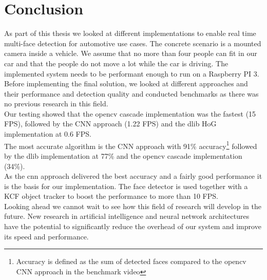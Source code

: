 \chapter{Conclusion}
As part of this thesis we looked at different implementations to enable real time multi-face detection for automotive use cases. The concrete scenario is a mounted camera inside a vehicle. We assume that no more than four people can fit in our car and that the people do not move a lot while the car is driving. The implemented system needs to be performant enough to run on a Raspberry PI 3.\\
Before implementing the final solution, we looked at different approaches and their performance and detection quality and conducted benchmarks as there was no previous research in this field.\\
Our testing showed that the \gls{opencv} cascade implementation was the fastest (15 FPS), followed by the CNN approach (1.22 FPS) and the \gls{dlib} HoG implementation at 0.6 FPS.\\
The most accurate algorithm is the CNN approach with 91\% accuracy\footnote{Accuracy is defined as the sum of detected faces compared to the \gls{opencv} CNN approach in the benchmark video} followed by the \gls{dlib} implementation at 77\% and the \gls{opencv} cascade implementation (34\%).\\
As the \gls{cnn} approach delivered the best accuracy and a fairly good performance it is the basis for our implementation. The face detector is used together with a KCF object tracker to boost the performance to more than 10 FPS.\\
Looking ahead we cannot wait to see how this field of research will develop in the future. New research in artificial intelligence and neural network architectures have the potential to significantly reduce the overhead of our system and improve its speed and performance. 

